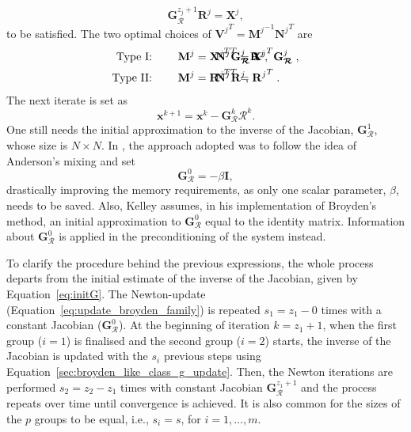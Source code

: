           \begin{equation}
            \mathbf{G}_{\bm{\mathcal{R}}}^{z_j+1} \mathbf R^j = \mathbf X^j,
          \end{equation}
          to be satisfied.
          The two optimal choices of \({\mathbf{V}^j}^T = {\mathbf{M}^j}^{-1}{\mathbf{N}^j}^T\) are
          \begin{align}
            \text{Type I: } \qquad & {\mathbf{M}^j} = {\mathbf X^j}^T \mathbf{G}_{\bm{\mathcal{R}}}^j \mathbf R^j, && \hspace{-2cm} {\mathbf{N}^j}^T = {\mathbf X^j}^T \mathbf{G}_{\bm{\mathcal{R}}}^j\;, \label{eq:broyden_type_i}\\
            \text{Type II: } \qquad & {\mathbf{M}^j} = {\mathbf R^j}^T \mathbf R^j, && \hspace{-2cm} {\mathbf{N}^j}^T = {\mathbf R^j}^T\;. \label{eq:broyden_type_ii}
          \end{align}
          The next iterate is set as
          \begin{equation} \label{eq:update_broyden_family}
            \mathbf{x}^{k+1}=\mathbf{x}^{k}-\mathbf{G}_{\bm{\mathcal{R}}}^{k} \bm{\mathcal{R}}^k.
          \end{equation}
          One still needs the initial approximation to the inverse of the Jacobian, \(\mathbf{G}_{\bm{\mathcal{R}}}^1\), whose size is \(N\times N\).
          In \cite{fang_two_2009}, the approach adopted was to follow the idea of Anderson's mixing and set
          \begin{equation}
            \mathbf{G}_{\bm{\mathcal{R}}}^0 = - \beta \mathbf{I}, \label{eq:initG}
          \end{equation}
          drastically improving the memory requirements, as only one scalar parameter, \(\beta\), needs to be saved.
          Also, Kelley \citep{kelley_solving_2003} assumes, in his implementation of Broyden's method, an initial approximation to \(\mathbf{G}_{\bm{\mathcal{R}}}^0\) equal to the identity matrix.
          Information about \(\mathbf{G}_{\bm{\mathcal{R}}}^0\) is applied in the preconditioning of the system instead.

          To clarify the procedure behind the previous expressions, the whole process departs from the initial estimate of the inverse of the Jacobian, given by Equation~\eqref{eq:initG}.
          The Newton-update (Equation~\eqref{eq:update_broyden_family}) is repeated $s_{1}=z_{1}-0$ times with a constant Jacobian (\(\mathbf{G}_{\bm{\mathcal{R}}}^0\)).
          At the beginning of iteration $k=z_{1}+1$, when the first group ($i=1$) is finalised and the second group ($i=2$) starts, the inverse of the Jacobian is updated with the $s_{i}$ previous steps using Equation~\eqref{sec:broyden_like_class_g_update}.
          Then, the Newton iterations are performed $s_{2}=z_{2}-z_{1}$ times with constant Jacobian \(\mathbf{G}_{\bm{\mathcal{R}}}^{z_{1}+1}\) and the process repeats over time until convergence is achieved.
          It is also common for the sizes of the \(p\) groups to be equal, i.e., \(s_i=s\), for \(i=1,\dots,m\).

